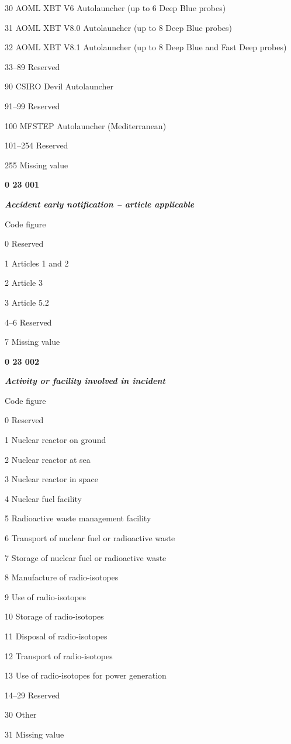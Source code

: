 30 AOML XBT V6 Autolauncher (up to 6 Deep Blue probes)

31 AOML XBT V8.0 Autolauncher (up to 8 Deep Blue probes)

32 AOML XBT V8.1 Autolauncher (up to 8 Deep Blue and Fast Deep probes)

33--89 Reserved

90 CSIRO Devil Autolauncher

91--99 Reserved

100 MFSTEP Autolauncher (Mediterranean)

101--254 Reserved

255 Missing value

\textbf{0 23 001}

\emph{\textbf{Accident early notification -- article applicable}}

Code figure

0 Reserved

1 Articles 1 and 2

2 Article 3

3 Article 5.2

4--6 Reserved

7 Missing value

\textbf{0 23 002}

\emph{\textbf{Activity or facility involved in incident}}

Code figure

0 Reserved

1 Nuclear reactor on ground

2 Nuclear reactor at sea

3 Nuclear reactor in space

4 Nuclear fuel facility

5 Radioactive waste management facility

6 Transport of nuclear fuel or radioactive waste

7 Storage of nuclear fuel or radioactive waste

8 Manufacture of radio-isotopes

9 Use of radio-isotopes

10 Storage of radio-isotopes

11 Disposal of radio-isotopes

12 Transport of radio-isotopes

13 Use of radio-isotopes for power generation

14--29 Reserved

30 Other

31 Missing value


